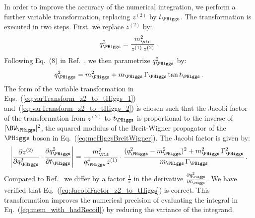 In order to improve the accuracy of the numerical integration,
we perform a further variable transformation, replacing $z^{(2)}$ by $t_{\PHiggs}$.
The transformation is executed in two steps. 
First, we replace $z^{(2)}$ by:
\begin{equation}
q_{\PHiggs}^{2} = \frac{m^{2}_{\vis}}{z^{(1)} \, z^{(2)}} \, .
\label{eq:varTransform_z2_to_tHiggs_1}
\end{equation}
Following Eq.~(8) in Ref.~\cite{Alwall:2010cq}, we then parametrize $q_{\PHiggs}^{2}$ by:
\begin{equation}
q_{\PHiggs}^{2} = m_{\PHiggs}^{2} + m_{\PHiggs} \, \Gamma_{\PHiggs}
\tan t_{\PHiggs} \, .
\label{eq:varTransform_z2_to_tHiggs_2}
\end{equation}
The form of the variable transformation in Eqs.~(\ref{eq:varTransform_z2_to_tHiggs_1}) and~(\ref{eq:varTransform_z2_to_tHiggs_2}) 
is chosen such that the Jacobi factor of the transformation from
$z^{(2)}$ to $t_{\PHiggs}$ is proportional to the inverse of $\vert \BW_{\PHiggs} \vert^{2}$, 
the squared modulus of the Breit-Wigner propagator of the $\PHiggs$ boson in
Eq.~(\ref{eq:meHiggsBreitWigner}).
The Jacobi factor is given by:
\begin{equation}
\left\lvert \frac{\partial z^{(2)}}{\partial q_{\PHiggs}^{2}} \cdot \frac{\partial
  q_{\PHiggs}^{2}}{\partial t_{\PHiggs}} \right\rvert =
\frac{m^{2}_{\vis}}{q_{\PHiggs}^{4} \, z^{(1)}} \cdot \frac{(q_{\PHiggs}^{2}
  - m_{\PHiggs}^{2})^{2} + m_{\PHiggs}^{2} \,
  \Gamma_{\PHiggs}^{2}}{m_{\PHiggs} \, \Gamma_{\PHiggs}} \, .
\label{eq:JacobiFactor_z2_to_tHiggs}  
\end{equation}
Compared to Ref.~\cite{Alwall:2010cq} we differ by a factor $\frac{1}{\pi}$ in the derivative 
$\frac{\partial q_{\PHiggs}^{2}}{\partial t_{\PHiggs}}$. We have verified that Eq.~(\ref{eq:JacobiFactor_z2_to_tHiggs}) is correct.
This transformation improves the numerical precision of evaluating the integral 
in Eq.~(\ref{eq:mem_with_hadRecoil}) by reducing the variance of the integrand.

